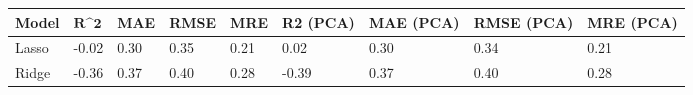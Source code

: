 \begin{table}
\centering
\label{table:iri_reg_pred}
\begin{tabular}{lllllllll}
\toprule
\textbf{Model} & $\textbf{R^2}$ & \textbf{MAE} & \textbf{RMSE} & \textbf{MRE} & \textbf{R2 (PCA)} & \textbf{MAE (PCA)} & \textbf{RMSE (PCA)} & \textbf{MRE (PCA)} \\
\midrule
         Lasso &          -0.02 &         0.30 &          0.35 &         0.21 &              0.02 &               0.30 &                0.34 &               0.21 \\
         Ridge &          -0.36 &         0.37 &          0.40 &         0.28 &             -0.39 &               0.37 &                0.40 &               0.28 \\
\bottomrule
\end{tabular}
\end{table}
